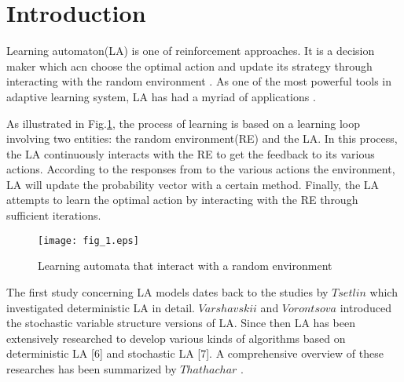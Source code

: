 \section{Introduction}
\label{intro}
Learning automaton(LA) is one of reinforcement approaches. It is a decision maker which acn choose the optimal action and update its strategy through interacting with the random environment \cite{narendra2012learning}. As one of the most powerful tools in adaptive learning system, LA has had a myriad of applications \cite{oommen1996graph}\cite{nicopolitidis2002using}\cite{esnaashari2010data}\cite{wang2014learning}\cite{zhao2015cellular}\cite{jiang2014new}.

As illustrated in Fig.\ref{fig:1}, the process of learning is based on a learning loop involving two entities: the random environment(RE) and the LA. In this process, the LA continuously interacts with the RE to get the feedback to its various actions. According to the responses from to the various actions the environment, LA will update the probability vector with a certain method. Finally, the LA attempts to learn the optimal action by interacting with the RE through sufficient iterations.

\begin{figure}
  \centering\texttt{[image: fig\_1.eps]}
\caption{Learning automata that interact with a random environment \cite{narendra2012learning}}
\label{fig:1}       %
\end{figure}


The first study concerning LA models dates back to the studies by $Tsetlin$ \cite{tsetlin1973automaton} which investigated deterministic LA in detail. $Varshavskii$ and $Vorontsova$ \cite{varshavskii1963behavior} introduced the stochastic variable structure versions of LA. Since then LA has been extensively researched to develop various kinds of algorithms based on deterministic LA [6] and stochastic LA [7]. A comprehensive overview of these researches has been summarized by $Thathachar$ \cite{thathachar2002varieties}.

